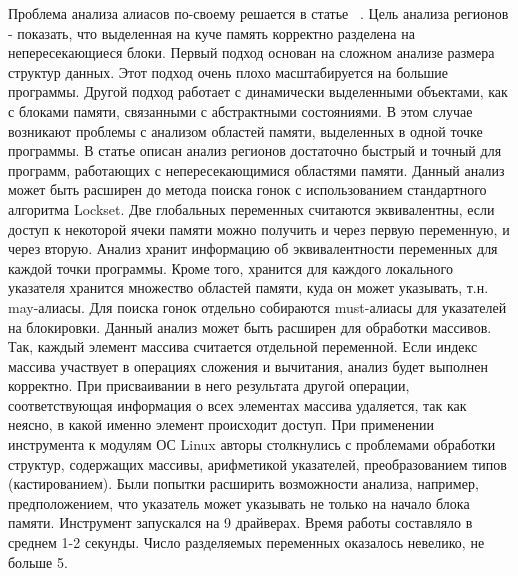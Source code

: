 Проблема анализа алиасов по-своему решается в статье ~\cite{Seidl:2009}.
Цель анализа регионов - показать, что выделенная на куче память корректно разделена на непересекающиеся блоки. Первый подход основан на сложном анализе размера структур данных. Этот подход очень плохо масштабируется на большие программы. Другой подход работает с динамически выделенными объектами, как с блоками памяти, связанными с абстрактными состояниями. В этом случае возникают проблемы с анализом областей памяти, выделенных в одной точке программы. В статье описан анализ регионов достаточно быстрый и точный для программ, работающих с непересекающимися областями памяти. Данный анализ может быть расширен до метода поиска гонок с использованием стандартного алгоритма Lockset. 
Две глобальных переменных считаются эквивалентны, если доступ к некоторой ячеки памяти можно получить и через первую переменную, и через вторую. Анализ хранит информацию об эквивалентности переменных для каждой точки программы. Кроме того, хранится для каждого локального указателя хранится множество областей памяти, куда он может указывать, т.н. may-алиасы. Для поиска гонок отдельно собираются must-алиасы для указателей на блокировки. 
Данный анализ может быть расширен для обработки массивов. Так, каждый элемент массива считается отдельной переменной. Если индекс массива участвует в операциях сложения и вычитания, анализ будет выполнен корректно. При присваивании в него результата другой операции, соответствующая информация о всех элементах массива удаляется, так как неясно, в какой именно элемент происходит доступ. 
При применении инструмента к модулям ОС Linux авторы столкнулись с проблемами обработки структур, содержащих массивы, арифметикой указателей, преобразованием типов (кастированием). Были попытки расширить возможности анализа, например, предположением, что указатель может указывать не только на начало блока памяти. 
Инструмент запускался на 9 драйверах. Время работы составляло в среднем 1-2 секунды. Число разделяемых переменных оказалось невелико, не больше 5.

